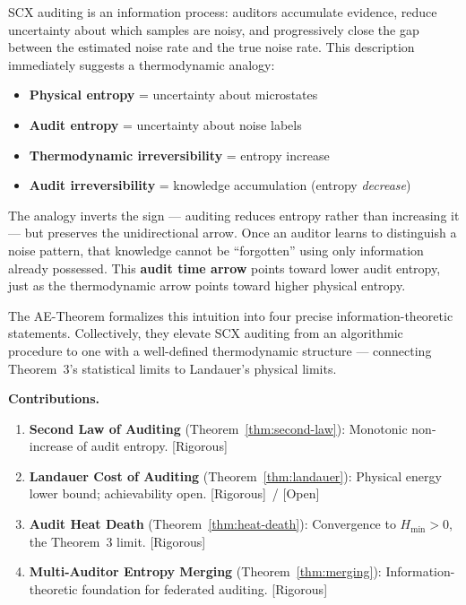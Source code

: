 \documentclass[12pt,a4paper]{article}
\newcommand{\rigorous}{\textcolor{green!50!black}{\small\textsf{[Rigorous]}}}
\newcommand{\openquest}{\textcolor{red!70!black}{\small\textsf{[Open]}}}
\begin{document}
SCX auditing is an information process: auditors accumulate evidence, reduce uncertainty about which samples are noisy, and progressively close the gap between the estimated noise rate and the true noise rate. This description immediately suggests a thermodynamic analogy:
\begin{itemize}
    \item \textbf{Physical entropy} = uncertainty about microstates
    \item \textbf{Audit entropy} = uncertainty about noise labels
    \item \textbf{Thermodynamic irreversibility} = entropy increase
    \item \textbf{Audit irreversibility} = knowledge accumulation (entropy \emph{decrease})
\end{itemize}

The analogy inverts the sign --- auditing reduces entropy rather than increasing it --- but preserves the unidirectional arrow. Once an auditor learns to distinguish a noise pattern, that knowledge cannot be ``forgotten'' using only information already possessed. This \textbf{audit time arrow} points toward lower audit entropy, just as the thermodynamic arrow points toward higher physical entropy.

The AE-Theorem formalizes this intuition into four precise information-theoretic statements. Collectively, they elevate SCX auditing from an algorithmic procedure to one with a well-defined thermodynamic structure --- connecting Theorem~3's statistical limits to Landauer's physical limits.

\medskip\noindent
\textbf{Contributions.}
\begin{enumerate}[label=(\arabic*)]
    \item \textbf{Second Law of Auditing} (Theorem~\ref{thm:second-law}): Monotonic non-increase of audit entropy. \rigorous
    \item \textbf{Landauer Cost of Auditing} (Theorem~\ref{thm:landauer}): Physical energy lower bound; achievability open. \rigorous~/ \openquest
    \item \textbf{Audit Heat Death} (Theorem~\ref{thm:heat-death}): Convergence to $H_{\min}>0$, the Theorem~3 limit. \rigorous
    \item \textbf{Multi-Auditor Entropy Merging} (Theorem~\ref{thm:merging}): Information-theoretic foundation for federated auditing. \rigorous
\end{enumerate}

\end{document}
